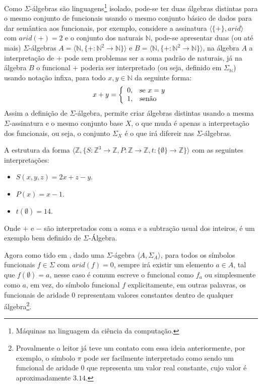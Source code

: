 \begin{nota}
  Como $\Sigma$-álgebras são linguagens\footnote{Máquinas na linguagem da ciência da computação.} isolado, pode-se ter duas álgebras distintas para o mesmo conjunto de funcionais usando o mesmo conjunto básico de dados para dar semântica aos funcionais, por exemplo, considere a assinatura $\langle \{+\}, arid \rangle$ com $arid(+)  = 2$ e o conjunto dos naturais $\mathbb{N}$, pode-se apresentar duas (ou até mais) $\Sigma$-álgebras $A = \langle \mathbb{N}, \{+ :\mathbb{N}^2 \rightarrow \mathbb{N}\} \rangle$ e $B = \langle \mathbb{N}, \{+ :\mathbb{N}^2 \rightarrow \mathbb{N}\} \rangle$, na álgebra $A$ a interpretação de $+$ pode sem problemas ser a soma padrão de naturais, já na álgebra $B$ o funcional $+$ poderia ser interpretado (ou seja, definido em $\Sigma_\mathbb{N}$) usando notação infixa, para todo $x, y \in \mathbb{N}$ da seguinte forma:
  \begin{eqnarray*}
    x + y = \left\{\begin{array}{ll}	0, & \hbox{se } x = y\\1,  & \hbox{senão}\end{array}\right.
  \end{eqnarray*}
  Assim a definição de $\Sigma$-álgebra, permite criar álgebras distintas usando a mesma $\Sigma$-assinatura e o mesmo conjunto base $X$, o que muda é apenas a interpretação dos funcionais, ou seja, o conjunto $\Sigma_X$ é o que irá difereir nas $\Sigma$-álgebras.
\end{nota}

\begin{exemplo}\label{exe:AlgebraUniversal1}
  A estrutura da forma $\langle \mathbb{Z}, \{S : \mathbb{Z}^3 \rightarrow \mathbb{Z}, P : \mathbb{Z} \rightarrow \mathbb{Z}, t:\{\emptyset\} \rightarrow \mathbb{Z} \} \rangle$ com as seguintes interpretações:
  \begin{itemize}
    \item $S(x, y, z) = 2x + z - y$.
    \item $P(x) = x - 1$.
    \item $t(\emptyset) = 14$.
  \end{itemize}
  Onde $+$ e $-$ são interpretados com a soma e a subtração usual dos inteiros, é um exemplo bem definido de $\Sigma$-Álgebra.
\end{exemplo}

Agora como tido em \cite{klaus2001}, dado uma $\Sigma$-ágebra $\langle A, \Sigma_A \rangle$, para todos os símbolos funcionais $f \in \Sigma$ com $arid(f) = 0$, sempre irá existir um elemento $a \in A$, tal que $f(\emptyset) = a$, nesse caso é comum escreve o funcional como $f_a$ ou simplesmente como $a$, em vez, do símbolo funcional $f$ explicitamente, em outras palavras, os funcionais de aridade $0$ representam valores constantes dentro de qualquer álgebra\footnote{Provalmente o leitor já teve um contato com essa ideia anteriormente, por exemplo, o símbolo $\pi$ pode ser facilmente interpretado como sendo um funcional de aridade $0$ que representa um valor real constante, cujo valor é aproximadamente $3.14$.}.

